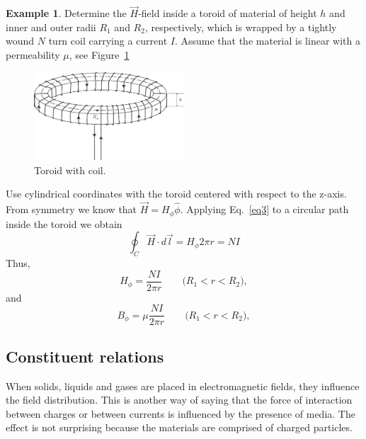\documentclass[11pt,a4paper,oneside]{book}
\numberwithin{equation}{section}
\theoremstyle{it}
\theoremstyle{definition}
\newtheorem{example}{Example}[section]
\begin{document}
\begin{example}
	Determine the $\vec{H}$-field inside a toroid of material of height $h$ and inner and outer radii $R_1$ and $R_2$, respectively, which is wrapped by a tightly wound $N$ turn coil carrying a current $I$. Assume that the material is linear with a permeability $\mu$, see Figure~\ref{toroid_coil}
	\begin{figure}[H] 
		\centering
		\includegraphics[width = 0.5\textwidth, width = 350pt, angle = 0, keepaspectratio]{figures/toroid_with_coil_2.eps}
		\captionsetup{width=0.75\textwidth}		
		\caption{Toroid with coil.}
		\label{toroid_coil}
	\end{figure}
Use cylindrical coordinates with the toroid centered with respect to the z-axis. From symmetry we know that $\vec{H}=H_\phi\hat{\phi}$. Applying Eq.~\eqref{eq3} to a circular path inside the toroid we obtain
\begin{equation*}\label{}
	\oint_{C}\vec{H}\cdot d\vec{l}=H_\phi 2\pi r = NI 
\end{equation*}
Thus, 
\begin{equation*}\label{}
	H_\phi=\frac{NI}{2\pi r}\qquad\text{($R_1<r<R_2$)},
\end{equation*}
and
\begin{equation*}\label{}
	B_\phi=\mu\frac{NI}{2\pi r}\qquad\text{($R_1<r<R_2$)},
\end{equation*}
\end{example}

\subsection{Constituent relations}
When solids, liquids and gases are placed in electromagnetic fields, they influence the field distribution.  This is another way of saying that the force of interaction between charges or between currents is influenced  by the presence of media. The effect is not surprising because the materials are comprised of charged particles.
\end{document}
